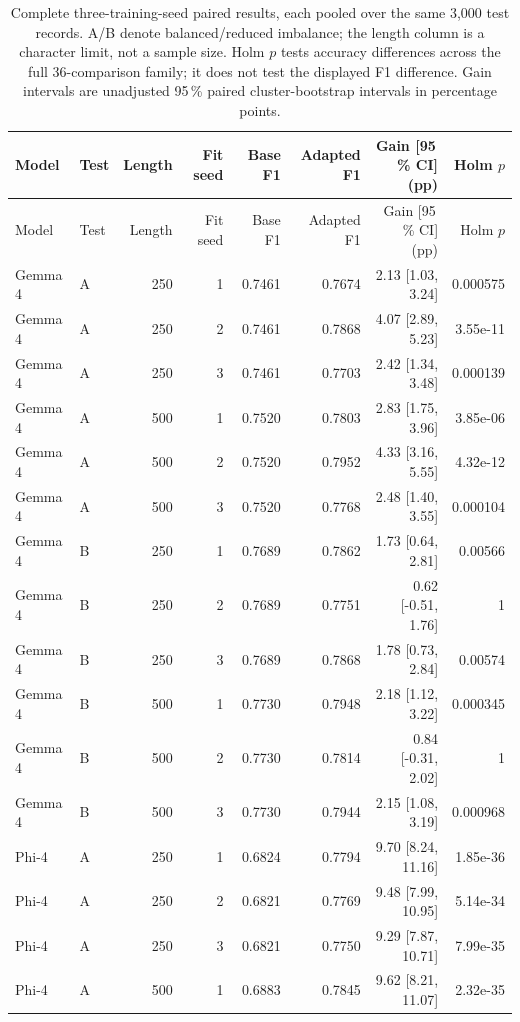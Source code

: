 \begin{longtable}{llrrrrrr}
\caption{Complete three-training-seed paired results, each pooled over
the same 3,000 test records. A/B denote balanced/reduced imbalance;
the length column is a character limit, not a sample size.
Holm $p$ tests accuracy differences across the full 36-comparison family;
it does not test the displayed F1 difference. Gain intervals are unadjusted
95\,\% paired cluster-bootstrap intervals in percentage points.}
\label{tab:replication_full}\\
\toprule Model & Test & Length & Fit seed & Base F1 & Adapted F1 & Gain [95\,\% CI] (pp) & Holm $p$ \\\midrule
\endfirsthead
\toprule Model & Test & Length & Fit seed & Base F1 & Adapted F1 & Gain [95\,\% CI] (pp) & Holm $p$ \\\midrule
\endhead
Gemma 4 & A & 250 & 1 & 0.7461 & 0.7674 & 2.13 [1.03, 3.24] & 0.000575 \\
Gemma 4 & A & 250 & 2 & 0.7461 & 0.7868 & 4.07 [2.89, 5.23] & 3.55e-11 \\
Gemma 4 & A & 250 & 3 & 0.7461 & 0.7703 & 2.42 [1.34, 3.48] & 0.000139 \\
Gemma 4 & A & 500 & 1 & 0.7520 & 0.7803 & 2.83 [1.75, 3.96] & 3.85e-06 \\
Gemma 4 & A & 500 & 2 & 0.7520 & 0.7952 & 4.33 [3.16, 5.55] & 4.32e-12 \\
Gemma 4 & A & 500 & 3 & 0.7520 & 0.7768 & 2.48 [1.40, 3.55] & 0.000104 \\
Gemma 4 & B & 250 & 1 & 0.7689 & 0.7862 & 1.73 [0.64, 2.81] & 0.00566 \\
Gemma 4 & B & 250 & 2 & 0.7689 & 0.7751 & 0.62 [-0.51, 1.76] & 1 \\
Gemma 4 & B & 250 & 3 & 0.7689 & 0.7868 & 1.78 [0.73, 2.84] & 0.00574 \\
Gemma 4 & B & 500 & 1 & 0.7730 & 0.7948 & 2.18 [1.12, 3.22] & 0.000345 \\
Gemma 4 & B & 500 & 2 & 0.7730 & 0.7814 & 0.84 [-0.31, 2.02] & 1 \\
Gemma 4 & B & 500 & 3 & 0.7730 & 0.7944 & 2.15 [1.08, 3.19] & 0.000968 \\
Phi-4 & A & 250 & 1 & 0.6824 & 0.7794 & 9.70 [8.24, 11.16] & 1.85e-36 \\
Phi-4 & A & 250 & 2 & 0.6821 & 0.7769 & 9.48 [7.99, 10.95] & 5.14e-34 \\
Phi-4 & A & 250 & 3 & 0.6821 & 0.7750 & 9.29 [7.87, 10.71] & 7.99e-35 \\
Phi-4 & A & 500 & 1 & 0.6883 & 0.7845 & 9.62 [8.21, 11.07] & 2.32e-35 \\

\end{longtable}
